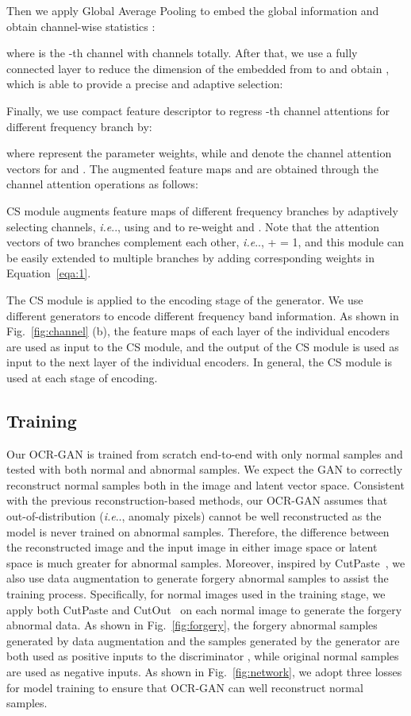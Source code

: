 \documentclass[lettersize,journal]{IEEEtran}
\makeatletter
\DeclareRobustCommand\onedot{\futurelet\@let@token\@onedot}
\def\@onedot{\ifx\@let@token.\else.\null\fi\xspace}
\def\ie{\emph{i.e}\onedot} \def\Ie{\emph{I.e}\onedot}
\makeatother
\begin{document}
Then we apply Global Average Pooling to embed the global information and obtain channel-wise statistics :

where  is the -th channel with  channels totally. After that, we use a fully connected layer to reduce the dimension of the embedded  from  to  and obtain , which is able to provide a precise and adaptive selection:

Finally, we use compact feature descriptor  to regress -th channel attentions for different frequency branch by:

where  represent the parameter weights, while  and  denote the channel attention vectors for  and . The augmented feature maps  and  are obtained through the channel attention operations as follows:

CS module augments feature maps of different frequency branches by adaptively selecting channels, \ie, using  and  to re-weight  and . Note that the attention vectors of two branches complement each other, \ie,  +  = 1, and this module can be easily extended to multiple branches by adding corresponding weights in Equation~\ref{eqa:1}. 

The CS module is applied to the encoding stage of the generator. We use different generators to encode different frequency band information. As shown in Fig.~\ref{fig:channel} (b), the feature maps of each layer of the individual encoders are used as input to the CS module, and the output of the CS module is used as input to the next layer of the individual encoders. In general, the CS module is used at each stage of encoding.

\subsection{Training}
Our OCR-GAN is trained from scratch end-to-end with only normal samples and tested with both normal and abnormal samples. We expect the GAN to correctly reconstruct normal samples both in the image and latent vector space. Consistent with the previous reconstruction-based methods, our OCR-GAN assumes that out-of-distribution (\ie, anomaly pixels) cannot be well reconstructed as the model is never trained on abnormal samples. Therefore, the difference between the reconstructed image and the input image in either image space or latent space is much greater for abnormal samples. Moreover, inspired by CutPaste~\cite{li2021cutpaste}, we also use data augmentation to generate forgery abnormal samples to assist the training process. Specifically, for normal images used in the training stage, we apply both CutPaste and CutOut~\cite{cutout} on each normal image to generate the forgery abnormal data. As shown in Fig.~\ref{fig:forgery}, the forgery abnormal samples generated by data augmentation and the samples generated by the generator are both used as positive inputs to the discriminator , while original normal samples are used as negative inputs. As shown in Fig.~\ref{fig:network}, we adopt three losses for model training to ensure that OCR-GAN can well reconstruct normal samples.
\end{document}
